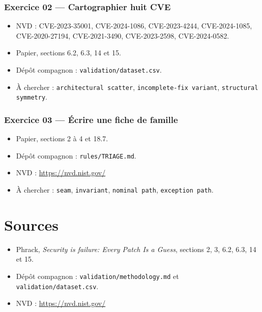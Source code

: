 \documentclass{training}
\begin{document}
\subsection*{Exercice 02 --- Cartographier huit CVE}
\begin{itemize}
  \item NVD : CVE-2023-35001, CVE-2024-1086, CVE-2023-4244,
        CVE-2024-1085, CVE-2020-27194, CVE-2021-3490, CVE-2023-2598,
        CVE-2024-0582.
  \item Papier, sections 6.2, 6.3, 14 et 15.
  \item Dépôt compagnon : \texttt{validation/dataset.csv}.
  \item À chercher : \texttt{architectural scatter},
        \texttt{incomplete-fix variant}, \texttt{structural symmetry}.
\end{itemize}

\subsection*{Exercice 03 --- Écrire une fiche de famille}
\begin{itemize}
  \item Papier, sections 2 à 4 et 18.7.
  \item Dépôt compagnon : \texttt{rules/TRIAGE.md}.
  \item NVD : \url{https://nvd.nist.gov/}
  \item À chercher : \texttt{seam}, \texttt{invariant}, \texttt{nominal path},
        \texttt{exception path}.
\end{itemize}

\chapter{Sources}
\begin{itemize}
  \item Phrack, \emph{Security is failure: Every Patch Is a Guess},
        sections 2, 3, 6.2, 6.3, 14 et 15.
  \item Dépôt compagnon :
        \texttt{validation/methodology.md} et \texttt{validation/dataset.csv}.
  \item NVD : \url{https://nvd.nist.gov/}
\end{itemize}

\end{document}
